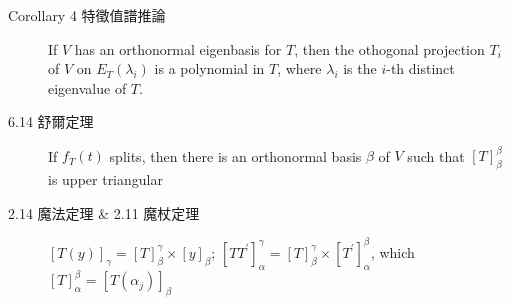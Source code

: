 \documentclass[9pt, twocolumn]{extarticle}
\begin{document}
\begin{description}
\begin{enumerate}
        \end{enumerate}
    \item[Corollary 4 特徵值譜推論] If $V$ has an orthonormal eigenbasis for $T$, then the othogonal projection $T_i$ of $V$ on $E_T(\lambda_i)$ is a polynomial in $T$, where $\lambda_i$ is the $i$-th distinct eigenvalue of $T$.
    \item[6.14 舒爾定理] If $f_T(t)$ splits, then there is an orthonormal basis $\beta$ of $V$ such that $[T]_{\beta}^{\beta}$ is upper triangular
    \item[2.14 魔法定理 \& 2.11 魔杖定理] $[T(y)]_{\gamma} = [T]^{\gamma}_{\beta} \times [y]_{\beta}$; $[TT^\prime]^{\gamma}_{\alpha} = [T]^{\gamma}_{\beta} \times [T^\prime]^{\beta}_{\alpha}$, which $[T]^{\beta}_{\alpha} = [T(\alpha_j)]_{\beta}$
        
\end{description}
\end{document}
